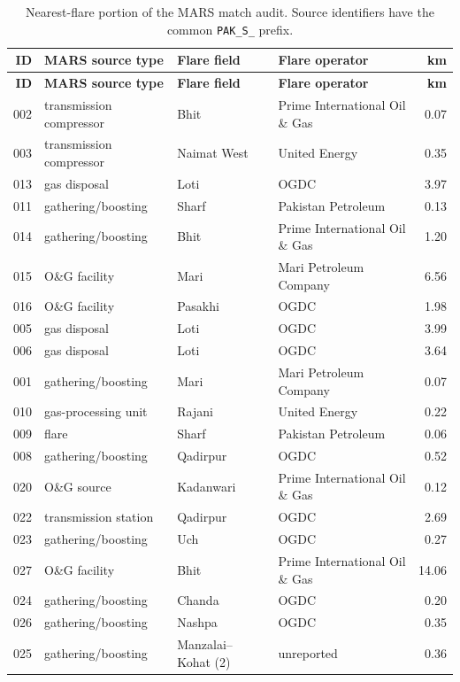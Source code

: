 \documentclass[3p,times,authoryear]{elsarticle}
\begin{document}
\scriptsize
\setlength{\tabcolsep}{3pt}
\begin{longtable}{@{}rp{}p{}p{}r@{}}
\caption{Nearest-flare portion of the MARS match audit. Source identifiers have the common
\texttt{PAK\_S\_} prefix.}\label{tab:s1match}\\
\toprule
\textbf{ID} & \textbf{MARS source type} & \textbf{Flare field} & \textbf{Flare operator} &
\textbf{km} \\
\midrule
\endfirsthead
\toprule
\textbf{ID} & \textbf{MARS source type} & \textbf{Flare field} & \textbf{Flare operator} &
\textbf{km} \\
\midrule
\endhead
002 & transmission compressor & Bhit & Prime International Oil \& Gas & 0.07 \\
003 & transmission compressor & Naimat West & United Energy & 0.35 \\
013 & gas disposal & Loti & OGDC & 3.97 \\
011 & gathering/boosting & Sharf & Pakistan Petroleum & 0.13 \\
014 & gathering/boosting & Bhit & Prime International Oil \& Gas & 1.20 \\
015 & O\&G facility & Mari & Mari Petroleum Company & 6.56 \\
016 & O\&G facility & Pasakhi & OGDC & 1.98 \\
005 & gas disposal & Loti & OGDC & 3.99 \\
006 & gas disposal & Loti & OGDC & 3.64 \\
001 & gathering/boosting & Mari & Mari Petroleum Company & 0.07 \\
010 & gas-processing unit & Rajani & United Energy & 0.22 \\
009 & flare & Sharf & Pakistan Petroleum & 0.06 \\
008 & gathering/boosting & Qadirpur & OGDC & 0.52 \\
020 & O\&G source & Kadanwari & Prime International Oil \& Gas & 0.12 \\
022 & transmission station & Qadirpur & OGDC & 2.69 \\
023 & gathering/boosting & Uch & OGDC & 0.27 \\
027 & O\&G facility & Bhit & Prime International Oil \& Gas & 14.06 \\
024 & gathering/boosting & Chanda & OGDC & 0.20 \\
026 & gathering/boosting & Nashpa & OGDC & 0.35 \\
025 & gathering/boosting & Manzalai--Kohat (2) & unreported & 0.36 \\
\bottomrule
\end{longtable}
\end{document}
